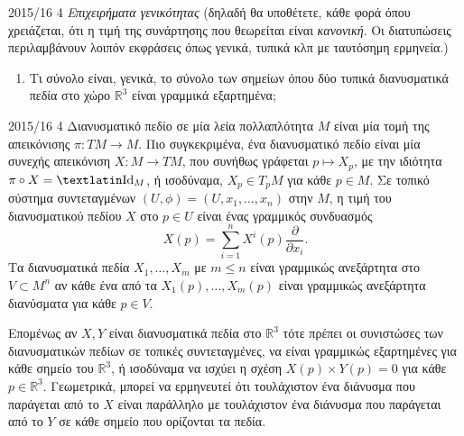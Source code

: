 \documentclass[a4paper,11pt]{article}
\begin{document}
\begin{exercise}{2015/16 4}
    \emph{Επιχειρήματα γενικότητας} (δηλαδή θα υποθέτετε, κάθε φορά όπου
    χρειάζεται, ότι η τιμή της συνάρτησης που θεωρείται είναι \emph{κανονική}.
    Οι διατυπώσεις περιλαμβάνουν λοιπόν εκφράσεις όπως γενικά,
    τυπικά κλπ με ταυτόσημη ερμηνεία.)
    \begin{enumerate}
        \item Τι σύνολο είναι, γενικά, το σύνολο των σημείων όπου δύο τυπικά
            διανυσματικά πεδία στο χώρο \( \mathbb{R}^3 \) είναι γραμμικά
            εξαρτημένα;
    \end{enumerate}
\end{exercise}
\begin{solution}{2015/16 4}
    Διανυσματικό πεδίο σε μία λεία πολλαπλότητα \( M \) είναι μία τομή της
    απεικόνισης \( \pi: TM \to M \). Πιο συγκεκριμένα, ένα διανυσματικό πεδίο
    είναι μία συνεχής απεικόνιση \( X: M \to TM \), που συνήθως γράφεται \( p
    \mapsto X_p \), με την ιδιότητα \( \pi \circ X = \text{\tl{Id}}_M \), ή
    ισοδύναμα, \( X_p \in T_pM \) για κάθε \( p \in M \). Σε τοπικό σύστημα
    συντεταγμένων \( (U, \phi) = (U,x_1, \dots, x_n ) \) στην \( M \), η τιμή
    του διανυσματικού πεδίου \( X \) στο \( p \in U \) είναι ένας γραμμικός
    συνδυασμός
    \begin{equation*}
        X(p) = \sum_{i=1}^n X^i(p) \frac{\partial}{\partial x_i}.
    \end{equation*}
    Τα διανυσματικά πεδία \( X_1, \dots, X_m \) με \( m \leq n \) είναι
    γραμμικώς ανεξάρτητα στο \( V \subset M^n \) αν κάθε ένα από τα
    \( X_1(p), \dots, X_m(p) \) είναι γραμμικώς ανεξάρτητα διανύσματα για
    κάθε \( p \in V \).

    Επομένως αν \( X, Y \)  είναι διανυσματικά πεδία στο \( \mathbb{R}^3 \)
    τότε πρέπει οι συνιστώσες των διανυσματικών πεδίων σε τοπικές συντεταγμένες,
    να είναι γραμμικώς εξαρτημένες για κάθε σημείο του \( \mathbb{R}^3 \), ή
    ισοδύναμα να ισχύει η σχέση \( X(p) \times Y(p) = 0 \) για κάθε \( p \in
    \mathbb{R}^3 \). Γεωμετρικά, μπορεί να ερμηνευτεί ότι τουλάχιστον ένα διάνυσμα που
    παράγεται από το \( X \) είναι παράλληλο με τουλάχιστον ένα διάνυσμα που παράγεται
    από το \( Y \) σε κάθε σημείο που ορίζονται τα πεδία.
\end{solution}
\end{document}
